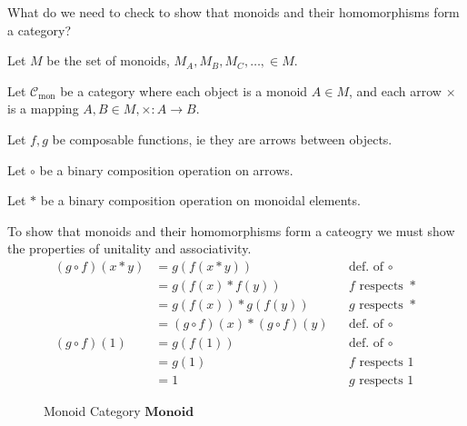 \begin{ttta}
What do we need to check to show that monoids and their homomorphisms form a
category?
\end{ttta}
\begin{proofitem}
\item Let $M$ be the set of monoids, $M_A, M_B, M_C, \ldots, \in M$.
\item Let $\mathcal{C}_\text{mon}$ be a category where each object is a monoid
    $A\in M$, and each arrow $\times$ is a mapping $A,B \in M, \times:
    A\rightarrow B$.
\item Let $f, g$ be composable functions, ie they are arrows between objects.
\item Let $\circ$ be a binary composition operation on arrows.
\item Let $\ast$ be a binary composition operation on monoidal elements.
\item To show that monoids and their homomorphisms form a cateogry we must show
    the properties of unitality and associativity.
\setcounter{equation}{0}
\begin{align}
    (g\circ f)(x\ast y) &= g(f(x\ast y)) && \text{def. of }\circ\\
    &= g(f(x) \ast f(y)) && f\text{ respects }\ast\\
    &= g(f(x)) \ast g(f(y)) && g\text{ respects }\ast\\
    &= (g\circ f)(x) \ast (g\circ f)(y) && \text{def. of }\circ\\
    (g\circ f)(1)&= g(f(1)) && \text{def. of }\circ\\
    &= g(1) && f \text{ respects }1\\
    &= 1 && g \text{ respects }1
\end{align}
\end{proofitem}
\begin{figure}[H]

\caption{Monoid Category $\mathbf{Monoid}$}
\end{figure}
